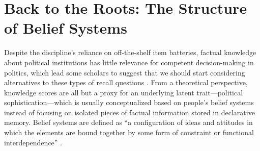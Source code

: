 \section*{Back to the Roots: The Structure of Belief Systems}



Despite the discipline's reliance on off-the-shelf item batteries, factual knowledge about political institutions has little relevance for competent decision-making in politics, which lead some scholars to suggest that we should start considering alternatives to these types of recall questions \citep{druckman2014pathologies}. From a theoretical perspective, knowledge scores are all but a proxy for an underlying latent trait---political sophistication---which is usually conceptualized based on people's belief systems instead of focusing on isolated pieces of factual information stored in declarative memory. Belief systems are defined as ``a configuration of ideas and attitudes in which the elements are bound together by some form of constraint or functional interdependence'' \citep[207]{converse1964nature}.

